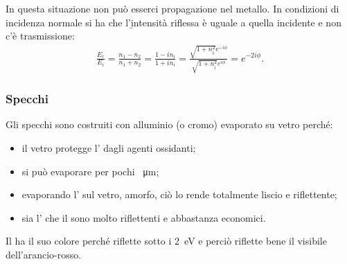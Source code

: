 In questa situazione non può esserci propagazione nel metallo. In condizioni di incidenza normale si ha che l'\b{intensità riflessa è uguale a quella incidente e non c'è trasmissione}:
\begin{equation}\begin{split}
\frac{E_r}{E_i}=\frac{n_1-n_2}{n_1+n_2}=\frac{1-in_i}{1+in_i}=\frac{\sqrt{1+n_i^2}e^{-i\phi}}{\sqrt{1+n_i^2}e^{i\phi}}=e^{-2i\phi}.
\end{split}\end{equation}

\subsubsection{Specchi}
Gli specchi sono costruiti con alluminio (o cromo) evaporato su vetro perché:
\begin{itemize}
\item il vetro protegge l' dagli agenti ossidanti;
\item si può evaporare  per pochi \SI{}{\um};
\item evaporando l' sul vetro, amorfo, ciò lo rende totalmente liscio e riflettente;
\item sia l' che il  sono molto riflettenti e abbastanza economici.
\end{itemize}

Il  ha il suo colore perché riflette sotto i \SI{2}{\electronvolt} e perciò riflette bene il visibile dell'arancio-rosso.